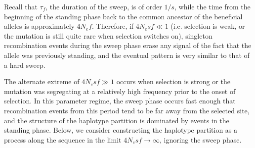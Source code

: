 \documentclass[a4paper,10pt]{article}
\begin{document}
Recall that $\tau_{f}$, the duration of the sweep, is of order $1/s$, while the time from the beginning of the standing phase back to the common ancestor of the beneficial alleles is approximately $4N_e f$. Therefore, if $4N_e s f \ll 1$ (i.e. selection is weak, or the mutation is still quite rare when selection switches on), singleton recombination events during the sweep phase erase any signal of the fact that the allele was previously standing, and the eventual pattern is very similar to that of a hard sweep.

The alternate extreme of $4N_e s f \gg 1$ occurs when selection is strong or the mutation was segregating at a relatively high frequency prior to the onset of selection. In this parameter regime, the sweep phase occurs fast enough that recombination events from this period tend to be far away from the selected site, and the structure of the haplotype partition is dominated by events in the standing phase. Below, we consider constructing the haplotype partition as a process along the sequence in the limit $4N_e s f \rightarrow \infty$, ignoring the sweep phase.
\end{document}
